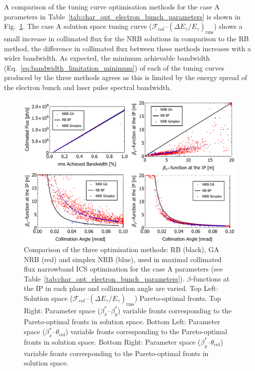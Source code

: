 \documentclass[../main.tex]{subfiles}
\begin{document}
A comparison of the tuning curve optimisation methods for the case A parameters in Table~\ref{tab:char_opt_electron_bunch_parameters} is shown in Fig.~\ref{fig:case_A_optimisation_comparison}. The case A solution space tuning curve ($\mathcal{F}_{\mathrm{col}}$--$\left(\Delta E_{\gamma}/E_{\gamma}\right)_{\mathrm{rms}}$) shows a small increase in collimated flux for the NRB solutions in comparison to the RB method, the difference in collimated flux between these methods increases with a wider bandwidth. As expected, the minimum achievable bandwidth (Eq.~\ref{eq:bandwidth_limitation_minimum}) of each of the tuning curves produced by the three methods agrees as this is limited by the energy spread of the electron bunch and laser pulse spectral bandwidth.

\begin{figure}[!h]
\centering
\includegraphics[width=\textwidth]{Figures/Optimisation_and_Characterisation_of_Inverse_Compton_Scattering_Sources/CaseAoptcomp.pdf}
\caption{Comparison of the three optimisation methods: RB (black), GA NRB (red) and simplex NRB (blue), used in maximal collimated flux narrowband ICS optimisation for the case A parameters (see Table~\ref{tab:char_opt_electron_bunch_parameters}). $\beta$-functions at the IP in each plane and collimation angle are varied. Top Left: Solution space ($\mathcal{F}_{\mathrm{col}}$--$\left(\Delta E_{\gamma}/E_{\gamma}\right)_{\mathrm{rms}}$) Pareto-optimal fronts. Top Right: Parameter space ($\beta_{x}^{*}$--$\beta_{y}^{*}$) variable fronts corresponding to the Pareto-optimal fronts in solution space. Bottom Left: Parameter space ($\beta_{x}^{*}$--$\theta_{\mathrm{col}}$) variable fronts corresponding to the Pareto-optimal fronts in solution space. Bottom Right: Parameter space ($\beta_{y}^{*}$--$\theta_{\mathrm{col}}$) variable fronts corresponding to the Pareto-optimal fronts in solution space.}
\label{fig:case_A_optimisation_comparison}
\end{figure}
\end{document}

